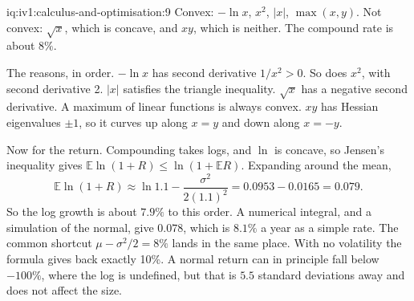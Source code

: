 \begin{solution}{iq:iv1:calculus-and-optimisation:9}
Convex: $-\ln x$, $x^2$, $|x|$, $\max(x, y)$. Not convex: $\sqrt{x}$, which is concave, and $xy$, which is neither. The compound rate is about $8\%$.

The reasons, in order. $-\ln x$ has second derivative $1/x^2 > 0$. So does $x^2$, with second derivative 2. $|x|$ satisfies the triangle inequality. $\sqrt{x}$ has a negative second derivative. A maximum of linear functions is always convex. $xy$ has Hessian eigenvalues $\pm 1$, so it curves up along $x = y$ and down along $x = -y$.

Now for the return. Compounding takes logs, and $\ln$ is concave, so Jensen's inequality gives $\mathbb{E}\ln(1 + R) \le \ln(1 + \mathbb{E}R)$. Expanding around the mean,
\[
\mathbb{E}\ln(1 + R) \approx \ln 1.1 - \frac{\sigma^2}{2(1.1)^2} = 0.0953 - 0.0165 = 0.079.
\]
So the log growth is about $7.9\%$ to this order. A numerical integral, and a simulation of the normal, give $0.078$, which is $8.1\%$ a year as a simple rate. The common shortcut $\mu - \sigma^2/2 = 8\%$ lands in the same place. With no volatility the formula gives back exactly 10\%. A normal return can in principle fall below $-100\%$, where the log is undefined, but that is $5.5$ standard deviations away and does not affect the size.



\end{solution}

